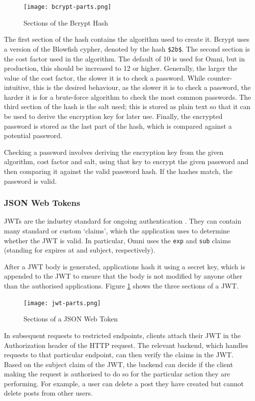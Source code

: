 \begin{figure}[htbp]
\texttt{[image: bcrypt-parts.png]}
\centering
\caption{Sections of the Bcrypt Hash}
\end{figure}

The first section of the hash contains the algorithm used to create it. Bcrypt uses a version of the Blowfish cypher, denoted by the hash \verb|$2b$|.
The second section is the cost factor used in the algorithm. The default of 10 is used for Omni, but in production, this should be increased to 12 or higher.
Generally, the larger the value of the cost factor, the slower it is to check a password.
While counter-intuitive, this is the desired behaviour, as the slower it is to check a password, the harder it is for a brute-force algorithm to check the most common passwords.
The third section of the hash is the salt used; this is stored as plain text so that it can be used to derive the encryption key for later use.
Finally, the encrypted password is stored as the last part of the hash, which is compared against a potential password.

Checking a password involves deriving the encryption key from the given algorithm, cost factor and salt, using that key to encrypt the given password and then comparing it against the valid password hash. If the hashes match, the password is valid.

\subsubsection{JSON Web Tokens}
JWTs are the industry standard for ongoing authentication \citep{ahmed2019authentication}. They can contain many standard or custom `claims', which the application uses to determine whether the JWT is valid.
In particular, Omni uses the \verb|exp| and \verb|sub| claims (standing for expires at and subject, respectively). 

After a JWT body is generated, applications hash it using a secret key, which is appended to the JWT to ensure that the body is not modified by anyone other than the authorised applications. 
Figure \ref{fig:jwt-parts} shows the three sections of a JWT.

\begin{figure}[htbp]
\texttt{[image: jwt-parts.png]}
\centering
\caption{Sections of a JSON Web Token}
\label{fig:jwt-parts}
\end{figure}

In subsequent requests to restricted endpoints, clients attach their JWT in the Authorization header of the HTTP request.
The relevant backend, which handles requests to that particular endpoint, can then verify the claims in the JWT.
Based on the subject claim of the JWT, the backend can decide if the client making the request is authorised to do so for the particular action they are performing.
For example, a user can delete a post they have created but cannot delete posts from other users.

